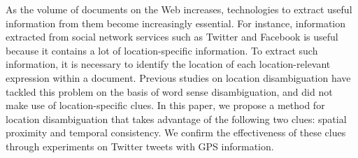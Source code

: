 As the volume of documents on the Web increases, technologies to extract useful information from them become increasingly essential. For instance, information extracted from social network services such as Twitter and Facebook is useful because it contains a lot of location-specific information. To extract such information, it is necessary to identify the location of each location-relevant expression within a document. Previous studies on location disambiguation have tackled this problem on the basis of word sense disambiguation, and did not make use of location-specific clues. In this paper, we propose a method for location disambiguation that takes advantage of the following two clues: spatial proximity and temporal consistency. We confirm the effectiveness of these clues through experiments on Twitter tweets with GPS information.
